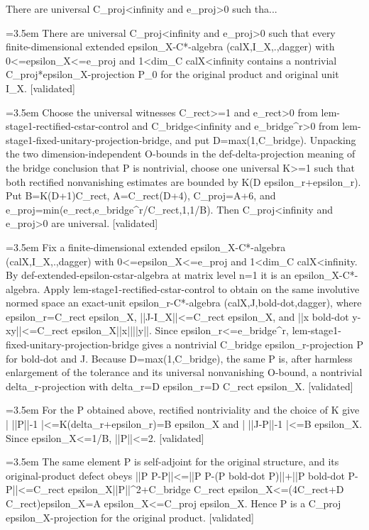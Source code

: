 \documentclass{article}
\newcommand{\step}[1]{\par\noindent\hangindent=3.5em\hangafter=1%
  \makebox[3.5em][l]{\textbf{#1.}}}
\newcommand{\steptag}[1]{\hfill{\small\textsf{[#1]}}}
\begin{document}
\begin{proofbox}{There are universal C\_proj<infinity and e\_proj>0 such tha...}
\step{1} There are universal C\_proj<infinity and e\_proj>0 such that every finite-dimensional extended epsilon\_X-C*-algebra (calX,I\_X,.,dagger) with 0<=epsilon\_X<=e\_proj and 1<dim\_C calX<infinity contains a nontrivial C\_proj*epsilon\_X-projection P\_0 for the original product and original unit I\_X. \steptag{validated} \\[6pt]
\step{1.1} Choose the universal witnesses C\_rect>=1 and e\_rect>0 from lem-stage1-rectified-cstar-control and C\_bridge<infinity and e\_bridge\textasciicircum{}r>0 from lem-stage1-fixed-unitary-projection-bridge, and put D=max(1,C\_bridge). Unpacking the two dimension-independent O-bounds in the def-delta-projection meaning of the bridge conclusion that P is nontrivial, choose one universal K>=1 such that both rectified nonvanishing estimates are bounded by K(D epsilon\_r+epsilon\_r). Put B=K(D+1)C\_rect, A=C\_rect(D+4), C\_proj=A+6, and e\_proj=min(e\_rect,e\_bridge\textasciicircum{}r/C\_rect,1,1/B). Then C\_proj<infinity and e\_proj>0 are universal. \steptag{validated} \\[4pt]
\step{1.2} Fix a finite-dimensional extended epsilon\_X-C*-algebra (calX,I\_X,.,dagger) with 0<=epsilon\_X<=e\_proj and 1<dim\_C calX<infinity. By def-extended-epsilon-cstar-algebra at matrix level n=1 it is an epsilon\_X-C*-algebra. Apply lem-stage1-rectified-cstar-control to obtain on the same involutive normed space an exact-unit epsilon\_r-C*-algebra (calX,J,bold-dot,dagger), where epsilon\_r=C\_rect epsilon\_X, ||J-I\_X||<=C\_rect epsilon\_X, and ||x bold-dot y-xy||<=C\_rect epsilon\_X||x||||y||. Since epsilon\_r<=e\_bridge\textasciicircum{}r, lem-stage1-fixed-unitary-projection-bridge gives a nontrivial C\_bridge epsilon\_r-projection P for bold-dot and J. Because D=max(1,C\_bridge), the same P is, after harmless enlargement of the tolerance and its universal nonvanishing O-bound, a nontrivial delta\_r-projection with delta\_r=D epsilon\_r=D C\_rect epsilon\_X. \steptag{validated} \\[4pt]
\step{1.3} For the P obtained above, rectified nontriviality and the choice of K give | ||P||-1 |<=K(delta\_r+epsilon\_r)=B epsilon\_X and | ||J-P||-1 |<=B epsilon\_X. Since epsilon\_X<=1/B, ||P||<=2. \steptag{validated} \\[4pt]
\step{1.4} The same element P is self-adjoint for the original structure, and its original-product defect obeys ||P P-P||<=||P P-(P bold-dot P)||+||P bold-dot P-P||<=C\_rect epsilon\_X||P||\textasciicircum{}2+C\_bridge C\_rect epsilon\_X<=(4C\_rect+D C\_rect)epsilon\_X=A epsilon\_X<=C\_proj epsilon\_X. Hence P is a C\_proj epsilon\_X-projection for the original product. \steptag{validated} \\[4pt]

\end{proofbox}
\end{document}
